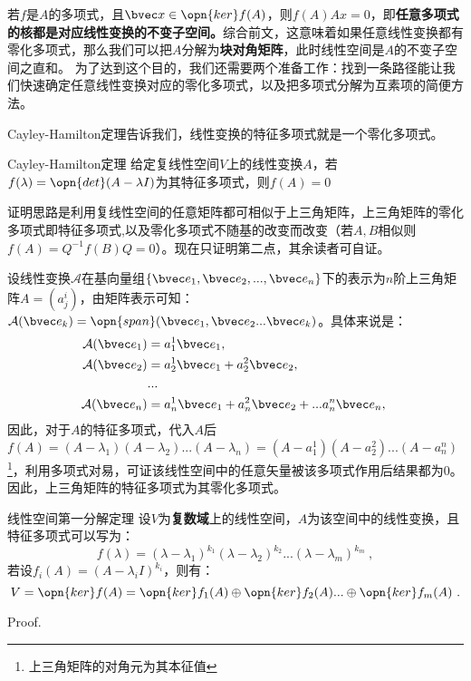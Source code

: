 若$f$是$A$的多项式，且$\bvec x\in \opn{ker}f(A)$，则$f(A)A x=0$，即\textbf{任意多项式的核都是对应线性变换的不变子空间。}综合前文，这意味着如果任意线性变换都有零化多项式，那么我们可以把$A$分解为\textbf{块对角矩阵}，此时线性空间是$A$的不变子空间之直和。
为了达到这个目的，我们还需要两个准备工作：找到一条路径能让我们快速确定任意线性变换对应的零化多项式，以及把多项式分解为互素项的简便方法。

Cayley-Hamilton定理告诉我们，线性变换的特征多项式就是一个零化多项式。
\begin{theorem}{Cayley-Hamilton定理}
给定复线性空间$V$上的线性变换$A$，若$f(\lambda)=\opn{det}(A-\lambda I)$为其特征多项式，则$f(A)=0$
\end{theorem}
证明思路是利用复线性空间的任意矩阵都可相似于上三角矩阵，上三角矩阵的零化多项式即特征多项式,以及零化多项式不随基的改变而改变（若$A,B$相似则$f(A)=Q^{-1}f(B)Q=0$）。现在只证明第二点，其余读者可自证。

设线性变换$\mathcal A$在基向量组$\{\bvec e_1,\bvec e_2,...,\bvec e_n\}$下的表示为$n$阶上三角矩阵$A=(a^i_j)$，由矩阵表示可知：$\mathcal A(\bvec e_k)=\opn{span}(\bvec e_1,\bvec e_2...\bvec e_k)$。具体来说是：
\begin{equation}
\begin{aligned}
\mathcal A(\bvec e_1)&=a^1_1 \bvec e_1,\\
\mathcal A(\bvec e_2)&=a^1_2 \bvec e_1+a^2_2\bvec e_2,\\
&...\\
\mathcal A(\bvec e_n)&=a^1_n \bvec e_1+a^2_n\bvec e_2+...a^n_n\bvec e_n,\\
\end{aligned}~
\end{equation}
因此，对于$A$的特征多项式，代入$A$后$f(A)=(A-\lambda_1)(A-\lambda_2)...(A-\lambda_n)=(A-a^1_1)(A-a^2_2)...(A-a^n_n)$\footnote{上三角矩阵的对角元为其本征值}，利用多项式对易，可证该线性空间中的任意矢量被该多项式作用后结果都为$0$。因此，上三角矩阵的特征多项式为其零化多项式。
\begin{theorem}{线性空间第一分解定理}\label{the_nullpl_1}
设$V$为\textbf{复数域}上的线性空间，$A$为该空间中的线性变换，且特征多项式可以写为：
\begin{equation}
f(\lambda)=(\lambda-\lambda_1)^{k_1}(\lambda-\lambda_2)^{k_2}...(\lambda-\lambda_m)^{k_m}~,
\end{equation}
若设$f_i(A)=(A-\lambda_iI)^{k_i}$，则有：
\begin{equation}
V=\opn{ker}f(A)=\opn{ker}f_1(A)\oplus\opn{ker}f_2(A)...\oplus\opn{ker}f_m(A)~.
\end{equation}
\end{theorem}
Proof.

